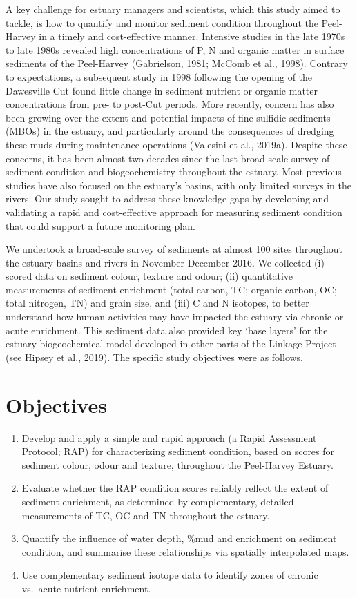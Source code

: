 \documentclass[
]{book}
\begin{document}
A key challenge for estuary managers and scientists, which this study aimed to tackle, is how to quantify and monitor sediment condition throughout the Peel-Harvey in a timely and cost-effective manner. Intensive studies in the late 1970s to late 1980s revealed high concentrations of P, N and organic matter in surface sediments of the Peel-Harvey (Gabrielson, 1981; McComb et al., 1998). Contrary to expectations, a subsequent study in 1998 following the opening of the Dawesville Cut found little change in sediment nutrient or organic matter concentrations from pre- to post-Cut periods. More recently, concern has also been growing over the extent and potential impacts of fine sulfidic sediments (MBOs) in the estuary, and particularly around the consequences of dredging these muds during maintenance operations (Valesini et al., 2019a). Despite these concerns, it has been almost two decades since the last broad-scale survey of sediment condition and biogeochemistry throughout the estuary. Most previous studies have also focused on the estuary's basins, with only limited surveys in the rivers. Our study sought to address these knowledge gaps by developing and validating a rapid and cost-effective approach for measuring sediment condition that could support a future monitoring plan.

We undertook a broad-scale survey of sediments at almost 100 sites throughout the estuary basins and rivers in November-December 2016. We collected (i) scored data on sediment colour, texture and odour; (ii) quantitative measurements of sediment enrichment (total carbon, TC; organic carbon, OC; total nitrogen, TN) and grain size, and (iii) C and N isotopes, to better understand how human activities may have impacted the estuary via chronic or acute enrichment. This sediment data also provided key `base layers' for the estuary biogeochemical model developed in other parts of the Linkage Project (see Hipsey et al., 2019). The specific study objectives were as follows.

\hypertarget{objectives-3}{%
\section{Objectives}\label{objectives-3}}

\begin{enumerate}
\def\labelenumi{\arabic{enumi})}
\item
  Develop and apply a simple and rapid approach (a Rapid Assessment Protocol; RAP) for characterizing sediment condition, based on scores for sediment colour, odour and texture, throughout the Peel-Harvey Estuary.
\item
  Evaluate whether the RAP condition scores reliably reflect the extent of sediment enrichment, as determined by complementary, detailed measurements of TC, OC and TN throughout the estuary.
\item
  Quantify the influence of water depth, \%mud and enrichment on sediment condition, and summarise these relationships via spatially interpolated maps.
\item
  Use complementary sediment isotope data to identify zones of chronic vs.~acute nutrient enrichment.
\end{enumerate}
\end{document}
